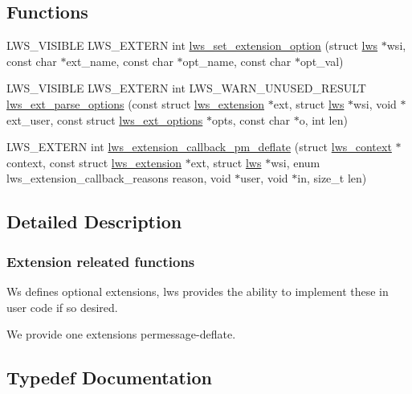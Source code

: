 \subsection*{Functions}
\begin{DoxyCompactItemize}
\item 
L\+W\+S\+\_\+\+V\+I\+S\+I\+B\+LE L\+W\+S\+\_\+\+E\+X\+T\+E\+RN int \hyperlink{group__extensions_gae0e24e1768f83a7fb07896ce975704b9}{lws\+\_\+set\+\_\+extension\+\_\+option} (struct \hyperlink{structlws}{lws} $\ast$wsi, const char $\ast$ext\+\_\+name, const char $\ast$opt\+\_\+name, const char $\ast$opt\+\_\+val)
\item 
L\+W\+S\+\_\+\+V\+I\+S\+I\+B\+LE L\+W\+S\+\_\+\+E\+X\+T\+E\+RN int L\+W\+S\+\_\+\+W\+A\+R\+N\+\_\+\+U\+N\+U\+S\+E\+D\+\_\+\+R\+E\+S\+U\+LT \hyperlink{group__extensions_ga6fb3e2c3dfb9d64dc87026a4e99c128b}{lws\+\_\+ext\+\_\+parse\+\_\+options} (const struct \hyperlink{structlws__extension}{lws\+\_\+extension} $\ast$ext, struct \hyperlink{structlws}{lws} $\ast$wsi, void $\ast$ext\+\_\+user, const struct \hyperlink{structlws__ext__options}{lws\+\_\+ext\+\_\+options} $\ast$opts, const char $\ast$o, int len)
\item 
L\+W\+S\+\_\+\+E\+X\+T\+E\+RN int \hyperlink{group__extensions_ga4cdbe42d872e21a448a947714d6c607e}{lws\+\_\+extension\+\_\+callback\+\_\+pm\+\_\+deflate} (struct \hyperlink{structlws__context}{lws\+\_\+context} $\ast$context, const struct \hyperlink{structlws__extension}{lws\+\_\+extension} $\ast$ext, struct \hyperlink{structlws}{lws} $\ast$wsi, enum lws\+\_\+extension\+\_\+callback\+\_\+reasons reason, void $\ast$user, void $\ast$in, size\+\_\+t len)
\end{DoxyCompactItemize}


\subsection{Detailed Description}
\subsubsection*{Extension releated functions}

Ws defines optional extensions, lws provides the ability to implement these in user code if so desired.

We provide one extensions permessage-\/deflate. 

\subsection{Typedef Documentation}
\mbox{\label{group__extensions_gaae7169b2cd346b34fa33d0250db2afd0}} 
